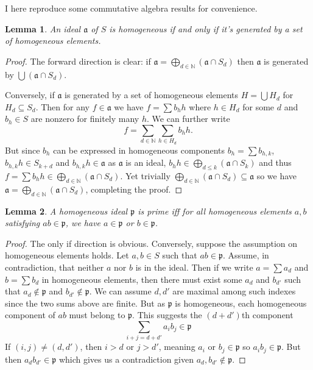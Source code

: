 \documentclass[12pt]{article}
\newtheorem{lemma}{Lemma}[subsection]
\theoremstyle{remark}
\newcommand{\N}[0]{\mathbb{N}}
\begin{document}
	I here reproduce some commutative algebra results for convenience.
	\begin{lemma}\label{l261}
		An ideal $\mathfrak a$ of $S$ is homogeneous if and only if it's generated by a set of homogeneous elements.
	\end{lemma}
	\begin{proof}
		The forward direction is clear: if $\mathfrak a=\bigoplus_{d\in\N} (\mathfrak a\cap S_d)$ then $\mathfrak a$ is generated by $\bigcup (\mathfrak a\cap S_d)$.

		Conversely, if $\mathfrak a$ is generated by a set of homogeneous elements $H=\bigcup H_d$ for $H_d\subseteq S_d$. Then for any $f\in \mathfrak a$ we have $f=\sum b_hh$ where $h\in H_d$ for some $d$ and $b_h\in S$ are nonzero for finitely many $h$. We can further write
		\[f=\sum_{d\in\mathbb N}\sum_{h\in H_d}b_hh.\]
		But since $b_h$ can be expressed in homogeneous components $b_h=\sum b_{h, k}$, $b_{h, k}h\in S_{k+d}$ and $b_{h, k}h\in \mathfrak a$ as $\mathfrak a$ is an ideal, $b_hh\in \bigoplus_{d\leqslant k} (\mathfrak a\cap S_k)$ and thus $f=\sum b_hh\in \bigoplus_{d\in\N} (\mathfrak a\cap S_d)$. Yet trivially $\bigoplus_{d\in\N} (\mathfrak a\cap S_d)\subseteq \mathfrak a$ so we have $\mathfrak a =\bigoplus_{d\in\N} (\mathfrak a\cap S_d)$, completing the proof.
	\end{proof}
	\begin{lemma}\label{l262}
		A homogeneous ideal $\mathfrak p$ is prime iff for all homogeneous elements $a, b$ satisfying $ab\in\mathfrak p$, we have $a\in\mathfrak p$ or $b\in\mathfrak p$.
	\end{lemma}
	\begin{proof}
		The only if direction is obvious. Conversely, suppose the assumption on homogeneous elements holds. Let $a, b\in S$ such that $ab\in\mathfrak p$. Assume, in contradiction, that neither $a$ nor $b$ is in the ideal. Then if we write $a=\sum a_d$ and $b=\sum b_d$ in homogeneous elements, then there must exist some $a_d$ and $b_{d'}$ such that $a_d\notin\mathfrak p$ and $b_{d'}\notin\mathfrak p$. We can assume $d, d'$ are maximal among such indexes since the two sums above are finite. But as $\mathfrak p$ is homogeneous, each homogeneous component of $ab$ must belong to $\mathfrak p$. This suggests the $(d+d')$th component
		\[\sum_{i+j=d+d'}a_ib_j\in\mathfrak p\]
		If $(i, j)\neq(d, d')$, then $i>d$ or $j>d'$, meaning $a_i$ or $b_j\in \mathfrak p$ so $a_ib_j\in\mathfrak p$. But then $a_db_{d'}\in\mathfrak p$ which gives us a contradiction given $a_d, b_{d'}\notin\mathfrak p$.
	\end{proof}
	
\end{document}
